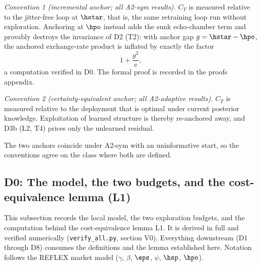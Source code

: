 \emph{Convention 1 (incremental anchor; all A2-sym results).} $C_T$ is
measured relative to the jitter-free loop at $\hstar$, that is, the same
retraining loop run without exploration. Anchoring at $\hpo$ instead adds
the sunk echo-chamber term and provably destroys the invariance of D2 (T2):
with anchor gap $g = \hstar - \hpo$, the anchored exchange-rate product is
inflated by exactly the factor
\begin{equation*}
1 + \frac{g^2}{v},
\end{equation*}
a computation verified in D0. The formal proof is recorded in the proofs
appendix.

\emph{Convention 2 (certainty-equivalent anchor; all A2-adaptive results).}
$C_T$ is measured relative to the deployment that is optimal under current
posterior knowledge. Exploitation of learned structure is thereby
re-anchored away, and D3b (L2, T4) prices only the unlearned residual.

The two anchors coincide under A2-sym with an uninformative start, so the
conventions agree on the class where both are defined.

\subsection*{D0: The model, the two budgets, and the cost-equivalence lemma (L1)}

This subsection records the local model, the two exploration budgets, and the
computation behind the cost-equivalence lemma L1. It is derived in full and
verified numerically (\texttt{verify\_all.py}, section V0). Everything
downstream (D1 through D8) consumes the definitions and the lemma established
here. Notation follows the REFLEX market model \citep{reflex2026}
($\gamma$, $\beta$, $\eps$, $\psi$, $\hsp$, $\hpo$).

